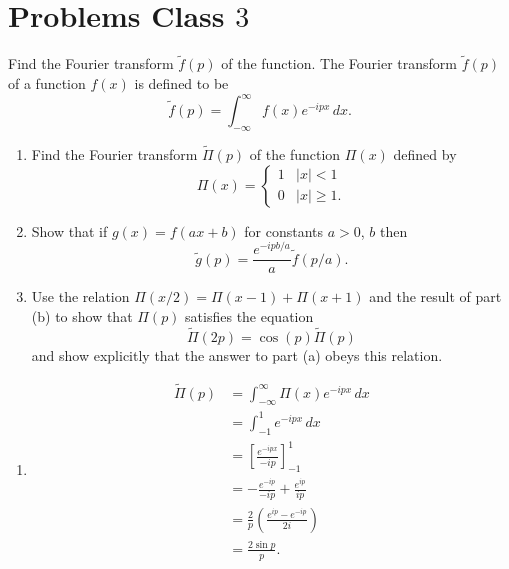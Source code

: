 \documentclass[10pt, a4paper]{article}
\begin{document}
\newpage

\section{Problems Class \texorpdfstring{$3$}{}}

\begin{problem}[Resit $2020$]
    Find the Fourier transform $\tilde{f}(p)$ of the function.
    The Fourier transform $\tilde{f}(p)$ of a function $f(x)$ is defined to be
    \[
    \tilde{f}(p) = \int_{-\infty}^{\infty}f(x)e ^ {-ipx}\,dx.
    \]

    \begin{enumerate}[label = (\alph*)]
        \item 
        Find the Fourier transform $\tilde{\Pi}(p)$ of the function $\Pi(x)$ defined by
        \[
        \Pi(x) = \begin{cases}
            1 & |x| < 1 \\
            0 & |x| \geq 1.
        \end{cases}
        \]

        \item Show that if $g(x) = f(ax + b)$ for constants $a > 0$,
        $b$ then
        \[
        \tilde{g}(p) = \frac{e ^ {-ipb / a}}{a}\tilde{f}(p / a).
        \]

        \item Use the relation $\Pi(x / 2) = \Pi(x - 1) + \Pi(x + 1)$ and the result of part (b) to show that $\Pi(p)$ satisfies the equation
        \[
        \tilde{\Pi}(2p) = \cos(p)\tilde{\Pi}(p)
        \]
        and show explicitly that the answer to part (a) obeys this relation.
    \end{enumerate}

    \begin{solution}
        \begin{enumerate}[label = (\alph*)]
            \item
            \begin{align*}
                \tilde{\Pi}(p) &= \int_{-\infty}^{\infty}\Pi(x)e ^ {-ipx}\,dx \\
                &= \int_{-1}^{1}e ^ {-ipx}\,dx \\
                &= \left[\frac{e ^ {-ipx}}{-ip}\right]_{-1}^{1} \\
                &= -\frac{e ^ {-ip}}{-ip} + \frac{e ^ {ip}}{ip} \\
                &= \frac{2}{p}\left(\frac{e ^ {ip} - e ^ {-ip}}{2i}\right) \\
                &= \frac{2\sin{p}}{p}.
            \end{align*}


\end{enumerate}
\end{solution}
\end{problem}
\end{document}

